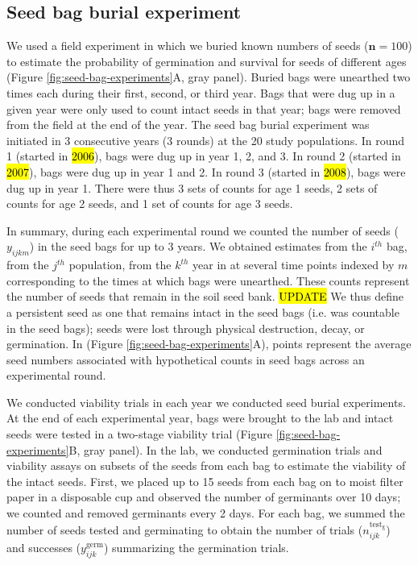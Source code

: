 \documentclass[12pt, oneside, titlepage]{article}   	%
\begin{document}
\subsection{Seed bag burial experiment}

We used a field experiment in which we buried known numbers of seeds ($\bm{n}=100$) to estimate the probability of germination and survival for seeds of different ages (Figure \ref{fig:seed-bag-experiments}A, gray panel). Buried bags were unearthed two times each during their first, second, or third year. Bags that were dug up in a given year were only used to count intact seeds in that year; bags were removed from the field at the end of the year. The seed bag burial experiment was initiated in 3 consecutive years (3 rounds) at the 20 study populations. In round 1 (started in \hl{2006}), bags were dug up in year 1, 2, and 3. In round 2 (started in \hl{2007}), bags were dug up in year 1 and 2. In round 3 (started in \hl{2008}), bags were dug up in year 1. There were thus 3 sets of counts for age 1 seeds, 2 sets of counts for age 2 seeds, and 1 set of counts for age 3 seeds. 

In summary, during each experimental round we counted the number of seeds ($y_{ijkm}$) in the seed bags for up to 3 years. We obtained estimates from the $i^{th}$ bag, from the $j^{th}$ population, from the $k^{th}$ year in at several time points indexed by $m$ corresponding to the times at which bags were unearthed. These counts represent the number of seeds that remain in the soil seed bank. \hl{UPDATE} We thus define a persistent seed as one that remains intact in the seed bags (i.e. was countable in the seed bags); seeds were lost through physical destruction, decay, or germination. In (Figure \ref{fig:seed-bag-experiments}A), points represent the average seed numbers associated with hypothetical counts in seed bags across an experimental round.

We conducted viability trials in each year we conducted seed burial experiments. At the end of each experimental year, bags were brought to the lab and intact seeds were tested in a two-stage viability trial (Figure \ref{fig:seed-bag-experiments}B, gray panel). In the lab, we conducted germination trials and viability assays on subsets of the seeds from each bag to estimate the viability of the intact seeds. First, we placed up to 15 seeds from each bag on to moist filter paper in a disposable cup and observed the number of germinants over 10 days; we counted and removed germinants every 2 days. For each bag, we summed the number of seeds tested and germinating to obtain the number of trials ($n^\mathrm{test_g}_{ijk}$) and successes ($y^{\mathrm{germ}}_{ijk}$) summarizing the germination trials. 
\end{document}
